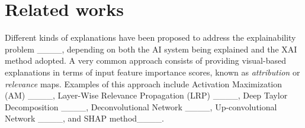 \section{Related works}
\label{sec:related}
Different kinds of explanations have been proposed to address the explainability problem ____, depending on both the AI system being explained and the XAI method adopted. A very common approach consists of providing visual-based explanations in terms of input feature importance scores, known as \textit{attribution } or \textit{relevance } maps. Examples of this approach include Activation Maximization (AM) ____, Layer-Wise Relevance Propagation (LRP) ____, Deep Taylor Decomposition ____, Deconvolutional Network ____, Up-convolutional Network ____, and SHAP method____. 



